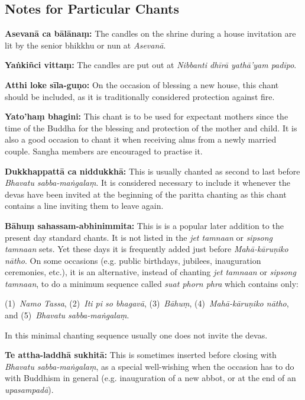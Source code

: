 \clearpage

\subsection*{Notes for Particular Chants}

\textbf{Asevanā ca bālānaṃ:} The candles on the shrine during a house invitation
are lit by the senior bhikkhu or nun at \emph{Asevanā}.

\textbf{Yaṅkiñci vittaṃ:} The candles are put out at \emph{Nibbanti
  dhīrā yathā'yam padīpo}.

\textbf{Atthi loke sīla-guṇo:} On the occasion of blessing a new house, this
chant should be included, as it is traditionally considered protection against
fire.

\textbf{Yato'haṃ bhagini:} This chant is to be used for expectant mothers since
the time of the Buddha for the blessing and protection of the mother and child.
It is also a good occasion to chant it when receiving alms from a newly married
couple. Sangha members are encouraged to practise it.

\textbf{Dukkhappattā ca niddukkhā:} This is usually chanted as second to last
before \emph{Bhavatu sabba-maṅgalaṃ}. It is considered necessary to include it
whenever the devas have been invited at the beginning of the paritta chanting
as this chant contains a line inviting them to leave again.

\textbf{Bāhuṃ sahassam-abhinimmita:} This is is a popular later addition to the
present day standard chants. It is not listed in the \emph{jet tamnaan} or
\emph{sipsong tamnaan} sets. Yet these days it is frequently added just before
\emph{Mahā-kāruṇiko nātho}. On some occasions (e.g. public birthdays, jubilees,
inauguration ceremonies, etc.), it is an alternative, instead of chanting
\emph{jet tamnaan} or \emph{sipsong tamnaan}, to do a minimum sequence called
\emph{suat phorn phra} which contains only:

(1)~\emph{Namo Tassa},
(2)~\emph{Iti pi so bhagavā},
(3)~\emph{Bāhuṃ}, 
(4)~\emph{Mahā-kāruṇiko nātho}, and
(5)~\emph{Bhavatu sabba-maṅgalaṃ}.

In this minimal chanting sequence usually one does not invite the devas.

\textbf{Te attha-laddhā sukhitā:} This is sometimes inserted before closing with
\emph{Bhavatu sabba-maṅgalaṃ}, as a special well-wishing when the occasion has
to do with Buddhism in general (e.g. inauguration of a new abbot, or at the end
of an \emph{upasampadā}).

